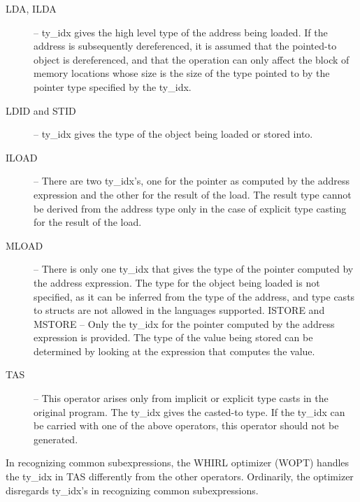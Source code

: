 \documentclass{article}
\begin{document}
\begin{description}
%
%
\item[LDA, ILDA] -- ty\_idx gives the high level type of the address
being loaded. If the address is subsequently dereferenced, it is
assumed that the pointed-to object is dereferenced, and that the
operation can only affect the block of memory locations whose size
is the size of the type pointed to by the pointer type specified
by the ty\_idx. 

%
%
\item[LDID and STID] -- ty\_idx gives the type of the object
being loaded or stored into.

%
\item[ILOAD] -- There are two ty\_idx's, one for the pointer as computed
by the address expression and the other for the result of the load.
The result type cannot be derived from the address type only in
the case of explicit type casting for the result of the load.

%
\item[MLOAD] -- There is only one ty\_idx that gives the type of the
pointer computed by the address expression. The type for the object
being loaded is not specified, as it can be inferred from the type
of the address, and type casts to structs are not allowed in the
languages supported.
%
ISTORE and
%
MSTORE -- Only the ty\_idx for the
pointer computed by the address expression is provided. The type of
the value being stored can be determined by looking at the expression
that computes the value.

%
\item[TAS] -- This operator arises only from implicit or explicit type
casts in the original program. The ty\_idx gives the casted-to type.
If the ty\_idx can be carried with one of the above operators, this
operator should not be generated.
\end{description}

In recognizing common subexpressions, the WHIRL optimizer (WOPT) handles
the ty\_idx in
TAS differently from the other operators. Ordinarily, the optimizer
disregards ty\_idx's in recognizing common subexpressions.
\end{document}

